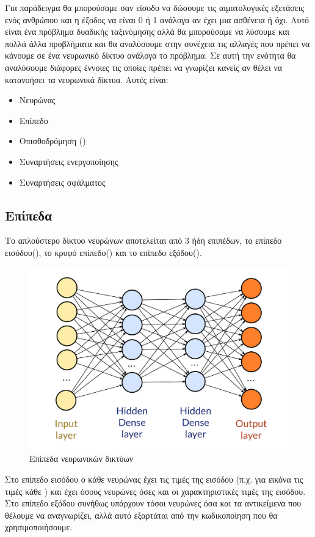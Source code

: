 Για παράδειγμα θα μπορούσαμε σαν είσοδο να δώσουμε τις αιματολογικές εξετάσεις
ενός ανθρώπου και η έξοδος να είναι 0 ή 1 ανάλογα αν έχει μια ασθένεια ή όχι. Αυτό είναι ένα πρόβλημα δυαδικής ταξινόμησης αλλά θα μπορούσαμε να λύσουμε και πολλά άλλα προβλήματα και θα αναλύσουμε στην συνέχεια τις αλλαγές που πρέπει να
κάνουμε σε ένα νευρωνικό δίκτυο ανάλογα το πρόβλημα. Σε αυτή την ενότητα θα αναλύσουμε διάφορες έννοιες τις οποίες πρέπει να γνωρίζει κανείς αν θέλει να κατανοήσει τα νευρωνικά δίκτυα. Αυτές είναι\cite{nnav}:
\begin{itemize}
    \item Νευρώνας
    \item Επίπεδο
    \item Οπισθοδρόμηση ()
    \item Συναρτήσεις ενεργοποίησης
    \item Συναρτήσεις σφάλματος
\end{itemize}
\subsection{Επίπεδα}
Το απλούστερο δίκτυο νευρώνων αποτελείται από 3 ήδη επιπέδων, το επίπεδο εισόδου(),
το κρυφό επίπεδο() και το επίπεδο εξόδου().

\begin{figure}[H]
    \centering
    \includegraphics[width=1\textwidth]{images/dense.png}
    \caption{Επίπεδα νευρωνικών δικτύων}
\end{figure}

Στο επίπεδο εισόδου ο κάθε νευρώνας έχει τις τιμές της εισόδου (π.χ. για εικόνα τις  τιμές
κάθε ) και έχει όσους νευρώνες όσες και οι χαρακτηριστικές τιμές της εισόδου. Στο
επίπεδο εξόδου συνήθως υπάρχουν τόσοι νευρώνες όσα και τα αντικείμενα που θέλουμε να
αναγνωρίζει, αλλά αυτό εξαρτάται από την κωδικοποίηση που θα χρησιμοποιήσουμε.

